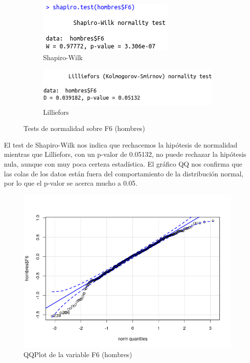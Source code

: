 \begin{figure}[H]
	\centering
	\begin{subfigure}{.5\textwidth}
		\centering
		\includegraphics[width=.6\linewidth]{swh-F6.png}
		\caption{Shapiro-Wilk}
		\label{fig:swh-F6}
	\end{subfigure}%
	\begin{subfigure}{.5\textwidth}
		\centering
		\includegraphics[width=.6\linewidth]{lh-F6.png}
		\caption{Lilliefors}
		\label{fig:lh-F6}
	\end{subfigure}
	\caption{Tests de normalidad sobre F6 (hombres)}
	\label{fig:normhF6}
\end{figure}

El test de Shapiro-Wilk nos indica que rechacemos la hipótesis de normalidad mientras que Lilliefors, con un p-valor de 0.05132, no puede rechazar la hipótesis nula, aunque con muy poca certeza estadística. El gráfico QQ nos confirma que las colas de los datos están fuera del comportamiento de la distribución normal, por lo que el p-valor se acerca mucho a 0.05.

\begin{figure}[H] %
	\centering
	\includegraphics[scale=0.6]{qq-F6h.png}  %
	\caption{QQPlot de la variable F6 (hombres)} 
	\label{fig:qq-F6h}
\end{figure}


